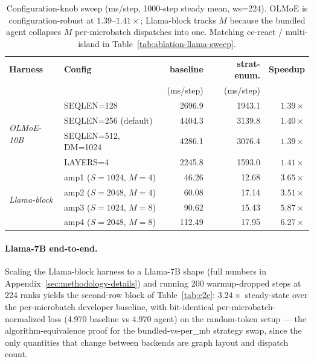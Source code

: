 \begin{table}[!htbp]
\centering\small
\setlength{\tabcolsep}{5pt}
\begin{tabular}{llrrr}
\toprule
\textbf{Harness} & \textbf{Config} & \textbf{baseline} & \textbf{strat-enum.} & \textbf{Speedup} \\
 & & (ms/step) & (ms/step) & \\
\midrule
\multirow{4}{*}{\textit{OLMoE-10B}}
  & SEQLEN=128             & 2696.9  & 1943.1 & $1.39\times$ \\
  & SEQLEN=256 (default)   & 4404.3  & 3139.8 & $1.40\times$ \\
  & SEQLEN=512, DM=1024    & 4286.1  & 3076.4 & $1.39\times$ \\
  & LAYERS=4               & 2245.8  & 1593.0 & $1.41\times$ \\
\midrule
\multirow{4}{*}{\textit{Llama-block}}
  & amp1 ($S{=}1024$, $M{=}4$) &  46.26 & 12.68 & $\mathbf{3.65\times}$ \\
  & amp2 ($S{=}2048$, $M{=}4$) &  60.08 & 17.14 & $\mathbf{3.51\times}$ \\
  & amp3 ($S{=}1024$, $M{=}8$) &  90.62 & 15.43 & $\mathbf{5.87\times}$ \\
  & amp4 ($S{=}2048$, $M{=}8$) & 112.49 & 17.95 & $\mathbf{6.27\times}$ \\
\bottomrule
\end{tabular}
\caption{Configuration-knob sweep (ms/step, 1000-step steady mean,
ws=224). OLMoE is configuration-robust at $1.39$--$1.41\times$;
Llama-block tracks $M$ because the bundled agent collapses $M$
per-microbatch dispatches into one. Matching cc-react / multi-island
in Table~\ref{tab:ablation-llama-sweep}.}
\label{tab:llama-sweep}
\end{table}

\paragraph{Llama-7B end-to-end.} Scaling the Llama-block harness
to a Llama-7B shape (full numbers in
Appendix~\ref{sec:methodology-details}) and running 200
warmup-dropped steps at 224 ranks yields the second-row block of
Table~\ref{tab:e2e}: $\mathbf{3.24\times}$ steady-state over the
per-microbatch developer baseline, with bit-identical
per-microbatch-normalized loss (4.970 baseline vs 4.970 agent) on
the random-token setup --- the algorithm-equivalence proof for
the bundled-vs-per\_mb strategy swap, since the only quantities
that change between backends are graph layout and dispatch count.

